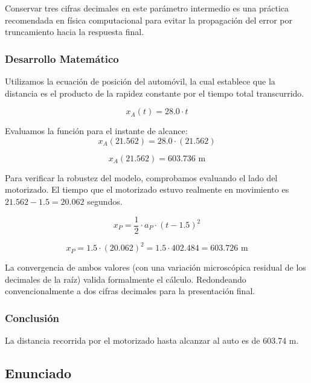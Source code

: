 \documentclass[12pt, a4paper]{article}
\begin{document}
Conservar tres cifras decimales en este parámetro intermedio es una práctica recomendada en física computacional para evitar la propagación del error por truncamiento hacia la respuesta final.

\subsubsection*{Desarrollo Matemático}

Utilizamos la ecuación de posición del automóvil, la cual establece que la distancia es el producto de la rapidez constante por el tiempo total transcurrido.

\begin{equation}
x_A(t) = 28.0 \cdot t
\end{equation}

Evaluamos la función para el instante de alcance:
\begin{equation}
x_A(21.562) = 28.0 \cdot (21.562)
\end{equation}

\begin{equation}
x_A(21.562) = 603.736 \text{ m}
\end{equation}

Para verificar la robustez del modelo, comprobamos evaluando el lado del motorizado. El tiempo que el motorizado estuvo realmente en movimiento es $21.562 - 1.5 = 20.062$ segundos.

\begin{equation}
x_P = \frac{1}{2} \cdot a_P \cdot (t - 1.5)^2
\end{equation}

\begin{equation}
x_P = 1.5 \cdot (20.062)^2 = 1.5 \cdot 402.484 = 603.726 \text{ m}
\end{equation}

La convergencia de ambos valores (con una variación microscópica residual de los decimales de la raíz) valida formalmente el cálculo. Redondeando convencionalmente a dos cifras decimales para la presentación final.

\subsubsection*{Conclusión}

La distancia recorrida por el motorizado hasta alcanzar al auto es de 603.74 m.

\newpage

\subsection*{Enunciado}
\end{document}
